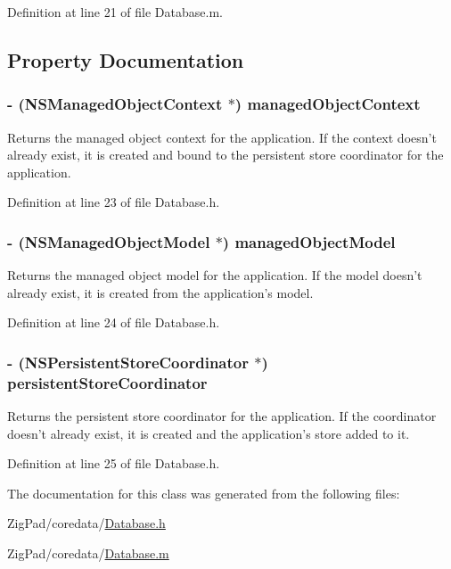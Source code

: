 Definition at line 21 of file Database.m.



\subsection{Property Documentation}
\hypertarget{interface_database_af5d2f65acff5f2c9e7e4ad472f38dfff}{
\subsubsection[{managedObjectContext}]{\setlength{\rightskip}{0pt plus 5cm}-\/ (NSManagedObjectContext $\ast$) managedObjectContext}}
\label{interface_database_af5d2f65acff5f2c9e7e4ad472f38dfff}
Returns the managed object context for the application. If the context doesn't already exist, it is created and bound to the persistent store coordinator for the application. 

Definition at line 23 of file Database.h.

\hypertarget{interface_database_a688e19e1a5eeabf38cb33bc0e0630950}{
\subsubsection[{managedObjectModel}]{\setlength{\rightskip}{0pt plus 5cm}-\/ (NSManagedObjectModel $\ast$) managedObjectModel}}
\label{interface_database_a688e19e1a5eeabf38cb33bc0e0630950}
Returns the managed object model for the application. If the model doesn't already exist, it is created from the application's model. 

Definition at line 24 of file Database.h.

\hypertarget{interface_database_a11b8c3b6ec8fa5f88cd057beec16a166}{
\subsubsection[{persistentStoreCoordinator}]{\setlength{\rightskip}{0pt plus 5cm}-\/ (NSPersistentStoreCoordinator $\ast$) persistentStoreCoordinator}}
\label{interface_database_a11b8c3b6ec8fa5f88cd057beec16a166}
Returns the persistent store coordinator for the application. If the coordinator doesn't already exist, it is created and the application's store added to it. 

Definition at line 25 of file Database.h.



The documentation for this class was generated from the following files:\begin{DoxyCompactItemize}
\item 
ZigPad/coredata/\hyperlink{_database_8h}{Database.h}\item 
ZigPad/coredata/\hyperlink{_database_8m}{Database.m}\end{DoxyCompactItemize}
